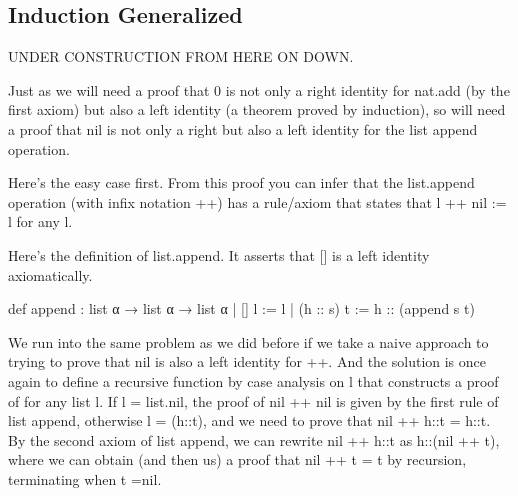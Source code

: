 \documentclass[letterpaper,10pt,english]{sphinxmanual}
\begin{document}
\subsection{Induction Generalized}
\label{\detokenize{A_03_Recursive_Types:induction-generalized}}
\sphinxAtStartPar
UNDER CONSTRUCTION FROM HERE ON DOWN.

\sphinxAtStartPar
Just as we will need a proof that 0 is not only a right
identity for nat.add (by the first axiom) but also a left
identity (a theorem proved by induction), so will need a
proof that nil is not only a right but also a left identity
for the list append operation.

\sphinxAtStartPar
Here’s the easy case first. From this proof you can infer
that the list.append operation (with infix notation ++) has
a rule/axiom that states that l ++ nil := l for any l.

\sphinxAtStartPar
Here’s the definition of list.append.
It asserts that {[}{]} is a left identity axiomatically.

\sphinxAtStartPar
def append : list α → list α → list α
| {[}{]}       l := l
| (h :: s) t := h :: (append s t)

\begin{sphinxVerbatim}[commandchars=\\\{\}]
               
 
 \PYG{o}{[}\PYG{o}{]}
\end{sphinxVerbatim}

\sphinxAtStartPar
We run into the same problem as we did before if we take a
naive approach to trying to prove that nil is also a left
identity for ++. And the solution is once again to define
a recursive function by case analysis on l that constructs
a proof of  for any list l. If l = list.nil,
the proof of nil ++ nil is given by the first rule of list
append, otherwise l = (h::t), and we need to prove that
nil ++ h::t = h::t. By the second axiom of list append,
we can rewrite nil ++ h::t as h::(nil ++ t), where we can
obtain (and then us) a proof that nil ++ t = t by recursion,
terminating when t =nil.
\end{document}
